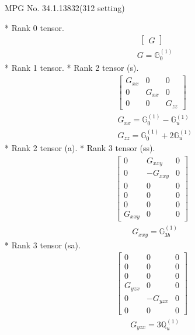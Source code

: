 \documentclass[fleqn,8pt,landscape]{jsarticle}
\begin{document}
\setcounter{MaxMatrixCols}{32}

\renewcommand{\tablename}{Table~}
\renewcommand{\figurename}{Figure~}
\begin{center}
\LARGE
MPG No. 34.1.138\quad$32$\quad(312 setting)
\end{center}
* Rank 0 tensor.
\begin{align*}
\begin{bmatrix} G \end{bmatrix}
\end{align*}
\begin{align*}
& G = \mathbb{G}_{0}^{(1)}
\end{align*}
* Rank 1 tensor.
* Rank 2 tensor (s).
\begin{align*}
\begin{bmatrix} G_{xx} & 0 & 0 \\ 0 & G_{xx} & 0 \\ 0 & 0 & G_{zz} \end{bmatrix}
\end{align*}
\begin{align*}
& G_{xx} = \mathbb{G}_{0}^{(1)} - \mathbb{G}_{u}^{(1)} \\
& G_{zz} = \mathbb{G}_{0}^{(1)} + 2 \mathbb{G}_{u}^{(1)}
\end{align*}
* Rank 2 tensor (a).
* Rank 3 tensor (ss).
\begin{align*}
\begin{bmatrix} 0 & G_{xxy} & 0 \\ 0 & - G_{xxy} & 0 \\ 0 & 0 & 0 \\ 0 & 0 & 0 \\ 0 & 0 & 0 \\ G_{xxy} & 0 & 0 \end{bmatrix}
\end{align*}
\begin{align*}
& G_{xxy} = \mathbb{G}_{3b}^{(1)}
\end{align*}
* Rank 3 tensor (sa).
\begin{align*}
\begin{bmatrix} 0 & 0 & 0 \\ 0 & 0 & 0 \\ 0 & 0 & 0 \\ G_{yzx} & 0 & 0 \\ 0 & - G_{yzx} & 0 \\ 0 & 0 & 0 \end{bmatrix}
\end{align*}
\begin{align*}
& G_{yzx} = 3 \mathbb{Q}_{u}^{(1)}
\end{align*}
\end{document}
